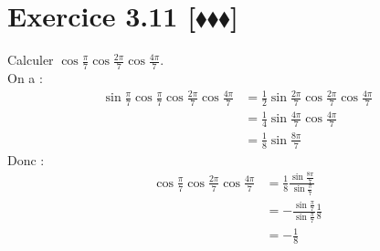 \documentclass[10pt]{article}
\begin{document}

\section*{Exercice 3.11 [$\blacklozenge\blacklozenge\blacklozenge$]}
\begin{tcolorbox}[enhanced, width=6in, center, size=fbox, fontupper=\large, drop shadow southwest]
    Calculer $\cos\frac{\pi}{7}\cos\frac{2\pi}{7}\cos\frac{4\pi}{7}$.\\
    On a :
    \begin{align*}
        \sin\frac{\pi}{7}\cos\frac{\pi}{7}\cos\frac{2\pi}{7}\cos\frac{4\pi}{7}&=\frac{1}{2}\sin\frac{2\pi}{7}\cos\frac{2\pi}{7}\cos\frac{4\pi}{7}\\
        &=\frac{1}{4}\sin\frac{4\pi}{7}\cos\frac{4\pi}{7}\\
        &=\frac{1}{8}\sin\frac{8\pi}{7}
    \end{align*}
    Donc :
    \begin{align*}
        \cos\frac{\pi}{7}\cos\frac{2\pi}{7}\cos\frac{4\pi}{7}&=\frac{1}{8}\frac{\sin\frac{8\pi}{7}}{\sin\frac{\pi}{7}}\\
        &=-\frac{\sin\frac{\pi}{7}}{\sin\frac{\pi}{7}}\frac{1}{8}\\
        &=-\frac{1}{8}
    \end{align*}
\end{tcolorbox}

\end{document}

